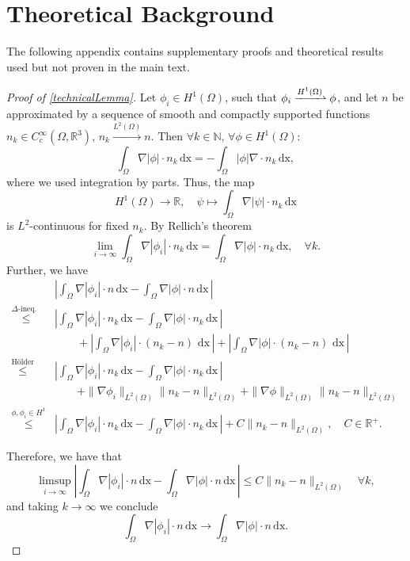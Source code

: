 \documentclass[12pt,openany]{book}
\newcommand{\R}{\mathbb{R}}
\theoremstyle{plainnormal}
\theoremstyle{remark}
\begin{document}
\chapter{Theoretical Background}
The following appendix contains supplementary proofs and theoretical results used but not proven in the main text.
\begin{proof}[Proof of \cref{technicalLemma}]
    Let $\phi_i\in H^1(\Omega)$, such that $\phi_i\xrightharpoonup{H^1(\Omega)} \phi$, and let $n$ be approximated by a sequence of smooth and compactly supported functions $n_k\in C_c^\infty(\Omega, \R^3)$, $n_k \xrightarrow{L^2(\Omega)} n$. Then $ \forall k\in \mathbb N, \, \forall \phi \in H^1(\Omega):$
    $$\int_\Omega \nabla |\phi|\cdot n_k \,\mathrm{dx} = - \int_\Omega |\phi| \nabla \cdot n_k \,\mathrm{dx},$$
    where we used integration by parts. Thus, the map $$
    H^1(\Omega) \rightarrow\R,\quad
        \psi \mapsto \int_\Omega \nabla |\psi|\cdot n_k \,\mathrm{dx}
     $$ 
    is $L^2$-continuous for fixed $n_k$. By Rellich's theorem $$\lim_{i\rightarrow\infty}\int_\Omega \nabla |\phi_i|\cdot n_k \,\mathrm{dx} = \int_\Omega \nabla |\phi|\cdot n_k \,\mathrm{dx}, \quad \forall k.$$ Further, we have
    \begin{align*}
        &\left|\int_\Omega \nabla |\phi_i|\cdot n \,\mathrm{dx} - \int_\Omega \nabla |\phi|\cdot n \,\mathrm{dx}\,\right|\\
       \overset{\Delta\text{-ineq.        }\,}{\leq} &\left|\int_\Omega \nabla |\phi_i|\cdot n_k \,\mathrm{dx} - \int_\Omega \nabla |\phi|\cdot n_k \,\mathrm{dx}\,\right| \\&\quad \quad + \left| \int_\Omega \nabla |\phi_i| \cdot (n_k - n) \, \,\mathrm{dx}\, \right| 
 + \left| \int_\Omega \nabla |\phi| \cdot (n_k - n) \, \,\mathrm{dx}\, \right|\\
       \overset{\text{Hölder}}{\leq} &\left|\int_\Omega \nabla |\phi_i|\cdot n_k \,\mathrm{dx} - \int_\Omega \nabla |\phi|\cdot n_k \,\mathrm{dx}\,\right| \\ &\quad \quad+ \|\nabla \phi_i\|_{L^2(\Omega)} \|n_k - n\|_{L^2(\Omega)}  + \|\nabla \phi\|_{L^2(\Omega)} \|n_k - n\|_{L^2(\Omega)}\\
       \overset{\phi, \phi_i \in H^1 }{\leq} &\left|\int_\Omega \nabla |\phi_i|\cdot n_k \,\mathrm{dx} - \int_\Omega \nabla |\phi|\cdot n_k \,\mathrm{dx}\,\right| + C\|n_k - n\|_{L^2(\Omega)},\quad C\in \R^+.
    \end{align*}
    
    Therefore, we have that $$\limsup_{i\rightarrow\infty} \left| \int_\Omega \nabla |\phi_i|\cdot n \,\mathrm{dx} - \int_\Omega \nabla |\phi|\cdot n \,\mathrm{dx}\,\right| \leq C\|n_k - n\|_{L^2(\Omega)}\quad \forall k,$$ and taking $k\rightarrow\infty$ we conclude $$\int_\Omega \nabla |\phi_i|\cdot n \,\mathrm{dx} \rightarrow\int_\Omega \nabla |\phi|\cdot n \,\mathrm{dx}.$$
\end{proof}
\end{document}

